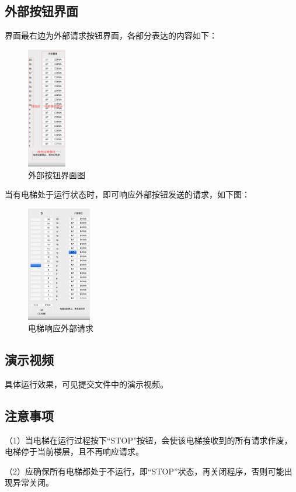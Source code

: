 \documentclass{article}
\begin{document}
\begin{CJK}{UTF8}{gbsn}
\subsection{外部按钮界面}
界面最右边为外部请求按钮界面，各部分表达的内容如下：
\begin{figure}[!h]
\centering
\includegraphics[width=0.15\textwidth]{7.png}
\caption{外部按钮界面图}
\end{figure}

当有电梯处于运行状态时，即可响应外部按钮发送的请求，如下图：
\begin{figure}[!h]
\centering
\includegraphics[width=0.25\textwidth]{8.png}
\caption{电梯响应外部请求}
\end{figure}

\subsection{演示视频}
具体运行效果，可见提交文件中的演示视频。

\subsection{注意事项}
（1）当电梯在运行过程按下“STOP”按钮，会使该电梯接收到的所有请求作废，电梯停于当前楼层，且不再响应请求。

（2）应确保所有电梯都处于不运行，即“STOP”状态，再关闭程序，否则可能出现异常关闭。


\end{CJK}
\end{document}
